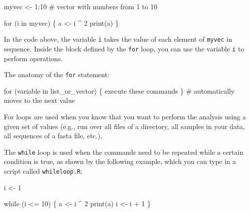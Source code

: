 \documentclass[
  letterpaper,
  DIV=11,
  numbers=noendperiod]{scrreprt}
\newenvironment{Shaded}{\begin{snugshade}}{\end{snugshade}}
\newcommand{\CommentTok}[1]{\textcolor[rgb]{0.37,0.37,0.37}{#1}}
\newcommand{\ControlFlowTok}[1]{\textcolor[rgb]{0.00,0.23,0.31}{#1}}
\newcommand{\DecValTok}[1]{\textcolor[rgb]{0.68,0.00,0.00}{#1}}
\newcommand{\FunctionTok}[1]{\textcolor[rgb]{0.28,0.35,0.67}{#1}}
\newcommand{\NormalTok}[1]{\textcolor[rgb]{0.00,0.23,0.31}{#1}}
\newcommand{\OtherTok}[1]{\textcolor[rgb]{0.00,0.23,0.31}{#1}}
\newcommand{\SpecialCharTok}[1]{\textcolor[rgb]{0.37,0.37,0.37}{#1}}
\begin{document}
\begin{Shaded}
\begin{Highlighting}[]
\NormalTok{myvec }\OtherTok{\textless{}{-}} \DecValTok{1}\SpecialCharTok{:}\DecValTok{10} \CommentTok{\# vector with numbers from 1 to 10}

\ControlFlowTok{for}\NormalTok{ (i }\ControlFlowTok{in}\NormalTok{ myvec) \{}
\NormalTok{  a }\OtherTok{\textless{}{-}}\NormalTok{ i }\SpecialCharTok{\^{}} \DecValTok{2}
  \FunctionTok{print}\NormalTok{(a)}
\NormalTok{\}}
\end{Highlighting}
\end{Shaded}

In the code above, the variable \texttt{i} takes the value of each
element of \texttt{myvec} in sequence. Inside the block defined by the
\texttt{for} loop, you can use the variable \texttt{i} to perform
operations.

The anatomy of the \texttt{for} statement:

\begin{Shaded}
\begin{Highlighting}[]
\ControlFlowTok{for}\NormalTok{ (variable }\ControlFlowTok{in}\NormalTok{ list\_or\_vector) \{}
\NormalTok{  execute these commands}
\NormalTok{\} }\CommentTok{\# automatically moves to the next value}
\end{Highlighting}
\end{Shaded}

For loops are used when you know that you want to perform the analysis
using a given set of values (e.g., run over all files of a directory,
all samples in your data, all sequences of a fasta file, etc.).

The \texttt{while} loop is used when the commands need to be repeated
while a certain condition is true, as shown by the following example,
which you can type in a script called \texttt{whileloop.R}:

\begin{Shaded}
\begin{Highlighting}[]
\NormalTok{i }\OtherTok{\textless{}{-}} \DecValTok{1}

\ControlFlowTok{while}\NormalTok{ (i }\SpecialCharTok{\textless{}=} \DecValTok{10}\NormalTok{) \{}
\NormalTok{  a }\OtherTok{\textless{}{-}}\NormalTok{ i }\SpecialCharTok{\^{}} \DecValTok{2}
  \FunctionTok{print}\NormalTok{(a)}
\NormalTok{  i }\OtherTok{\textless{}{-}}\NormalTok{ i }\SpecialCharTok{+} \DecValTok{1} 
\NormalTok{\}}
\end{Highlighting}
\end{Shaded}
\end{document}

